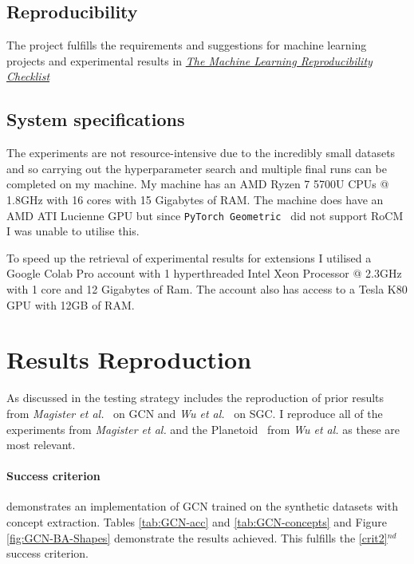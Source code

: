\subsection{Reproducibility}
The project fulfills the requirements and suggestions for machine learning projects and experimental results in \href{https://www.cs.mcgill.ca/~jpineau/ReproducibilityChecklist-v2.0.pdf}{\textit{The Machine Learning Reproducibility Checklist}}~\cite{pineau2021improving} 

\subsection{System specifications}
The experiments are not resource-intensive due to the incredibly small datasets and so carrying out the hyperparameter search and multiple final runs can be completed on my machine.
My machine has an AMD Ryzen 7 5700U CPUs @ 1.8GHz with 16 cores with 15 Gigabytes of RAM.
The machine does have an AMD ATI Lucienne GPU but since \texttt{PyTorch Geometric}~\cite{paszke2019pytorch} did not support RoCM I was unable to utilise this.

To speed up the retrieval of experimental results for extensions I utilised a Google Colab Pro account with 1 hyperthreaded Intel Xeon Processor @ 2.3GHz with 1 core and 12 Gigabytes of Ram.
The account also has access to a Tesla K80 GPU with 12GB of RAM.

\section{Results Reproduction}
\label{sec:reproduction}

As discussed in  the testing strategy includes the reproduction of prior results from \textit{Magister et al.}~\cite{magister2021gcexplainer} on GCN and \textit{Wu et al.}~\cite{wu2019simplifying} on SGC.
I reproduce all of the experiments from \textit{Magister et al.} and the Planetoid~\cite{kipf2016semi} from \textit{Wu et al.} as these are most relevant.

\paragraph{Success criterion}
 demonstrates an implementation of GCN trained on the synthetic datasets with concept extraction.
Tables \ref{tab:GCN-acc} and \ref{tab:GCN-concepts} and Figure \ref{fig:GCN-BA-Shapes} demonstrate the results achieved.
This fulfills the \ref{crit2}$^{nd}$ success criterion.

